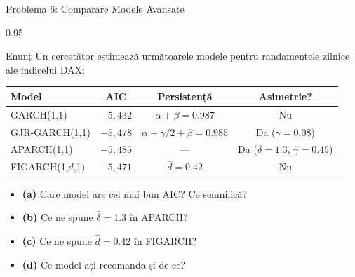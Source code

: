 \documentclass[9pt, aspectratio=169, t]{beamer}
\begin{document}
\begin{frame}{Problema 6: Comparare Modele Avansate}
    \begin{cminipage}{0.95\textwidth}
    \begin{block}{Enunț}
        Un cercetător estimează următoarele modele pentru randamentele zilnice ale indicelui DAX:

        \vspace{0.3cm}
        \begin{center}
        {\footnotesize
            \begin{tabular}{lccc}
                \toprule
                \textbf{Model} & \textbf{AIC} & \textbf{Persistență} & \textbf{Asimetrie?} \\
                \midrule
                GARCH(1,1) & $-5{,}432$ & $\alpha + \beta = 0.987$ & Nu \\
                GJR-GARCH(1,1) & $-5{,}478$ & $\alpha + \gamma/2 + \beta = 0.985$ & Da ($\gamma = 0.08$) \\
                APARCH(1,1) & $-5{,}485$ & --- & Da ($\hat{\delta} = 1.3$, $\hat{\gamma} = 0.45$) \\
                FIGARCH(1,$d$,1) & $-5{,}471$ & $\hat{d} = 0.42$ & Nu \\
                \bottomrule
            \end{tabular}
        }
        \end{center}

        \vspace{0.3cm}
        \begin{itemize}\setlength{\itemsep}{0pt}
            \item \textbf{(a)} Care model are cel mai bun AIC? Ce semnifică?
            \item \textbf{(b)} Ce ne spune $\hat{\delta} = 1.3$ în APARCH?
            \item \textbf{(c)} Ce ne spune $\hat{d} = 0.42$ în FIGARCH?
            \item \textbf{(d)} Ce model ați recomanda și de ce?
        \end{itemize}
    \end{block}
    \end{cminipage}
\end{frame}
\end{document}
